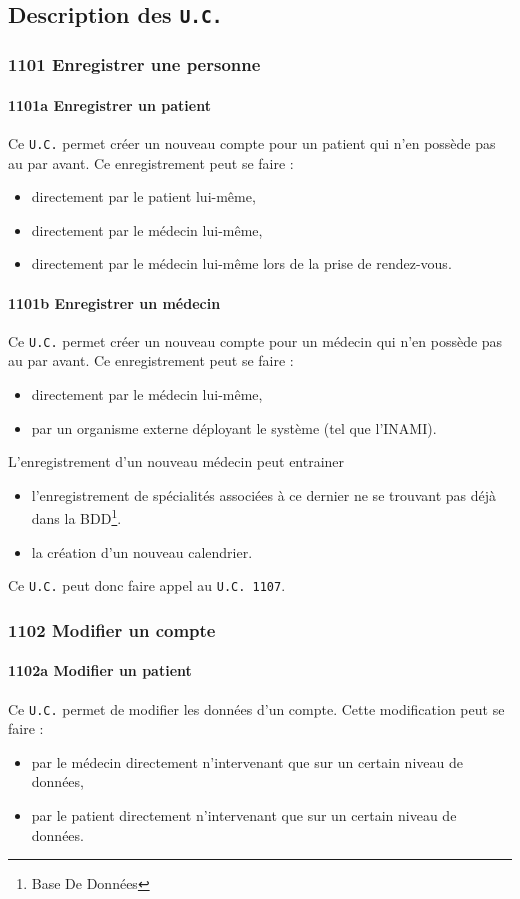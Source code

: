 \documentclass[a4paper, 11pt]{report}
\begin{document}
\subsection{Description des \texttt{U.C.}}
\subsubsection{1101 Enregistrer une personne}
\paragraph{1101a Enregistrer un patient}
Ce \texttt{U.C.} permet créer un nouveau compte pour un patient qui n'en possède pas au
par avant. Ce enregistrement peut se faire :
\begin{itemize}
	\item directement par le patient lui-même,
	\item directement par le médecin lui-même,
	\item directement par le médecin lui-même lors de la prise de rendez-vous.
\end{itemize}
\paragraph{1101b Enregistrer un médecin}
Ce \texttt{U.C.} permet créer un nouveau compte pour un médecin qui n'en possède pas au
par avant. Ce enregistrement peut se faire :
\begin{itemize}
	\item directement par le médecin lui-même,
	\item par un organisme externe déployant le système (tel que l'INAMI).
\end{itemize}

L'enregistrement d'un nouveau médecin peut entrainer 
\begin{itemize}
	\item l'enregistrement de	spécialités associées à ce dernier ne se trouvant pas déjà dans la 
		BDD\footnote{Base De Données}.
	\item la création d'un nouveau calendrier.
\end{itemize}
Ce \texttt{U.C.} peut donc faire appel au \texttt{U.C. 1107}.
\subsubsection{1102 Modifier un compte}

\paragraph{1102a Modifier un patient}
Ce \texttt{U.C.} permet de modifier les données d'un compte. Cette modification
peut se faire :
\begin{itemize}
	\item par le médecin directement n'intervenant que sur un certain niveau de
		données,
	\item par le patient directement n'intervenant que sur un certain niveau de
		données.
\end{itemize}
\end{document}
